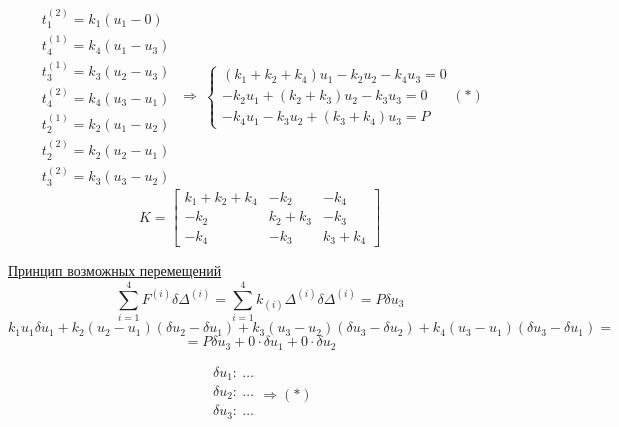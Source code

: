 \[ \begin{matrix}
t_1^{(2)}=k_1(u_1-0) \\ t_4^{(1)} = k_4(u_1-u_3) \\ t_3^{(1)} = k_3(u_2-u_3) \\ t_4^{(2)}=k_4(u_3-u_1) \\ t_2^{(1)} = k_2(u_1-u_2) \\ t_2^{(2)} = k_2(u_2-u_1) \\ t_3^{(2)} = k_3(u_3-u_2)
\end{matrix} \ \Rightarrow \ \begin{cases}
(k_1+k_2+k_4)u_1-k_2u_2-k_4u_3=0 \\ -k_2u_1 + (k_2+k_3)u_2-k_3u_3=0 \\ -k_4u_1-k_3u_2+ (k_3+k_4)u_3=P
\end{cases} (\ast)
\]
\[
K=\begin{bmatrix}
	k_1+k_2+k_4 & -k_2 & -k_4 \\
	-k_2 & k_2+k_3 & -k_3 \\
	-k_4 & -k_3 & k_3+k_4
\end{bmatrix}
\]



\underline{Принцип возможных перемещений}
\[
\sum_{i=1}^4 F^{(i)}\delta\Delta^{(i)}= \sum_{i=1}^4 k_{(i)}\Delta^{(i)}\delta\Delta^{(i)}=P\delta u_3
\]
\[
k_1u_1\delta u_1 +k_2(u_2-u_1)(\delta u_2-\delta u_1)+k_3(u_3-u_2)(\delta u_3-\delta u_2)+k_4(u_3-u_1)(\delta u_3-\delta u_1)= \]
\[ = P\delta u_3 + 0\cdot \delta u_1+0\cdot \delta u_2
\]

\[
\begin{matrix}
	 \delta u_1: \ \dotsc \\
	 \delta u_2: \ \dotsc \\
	 \delta u_3: \ \dotsc \\
\end{matrix} \Rightarrow (\ast)
\]
